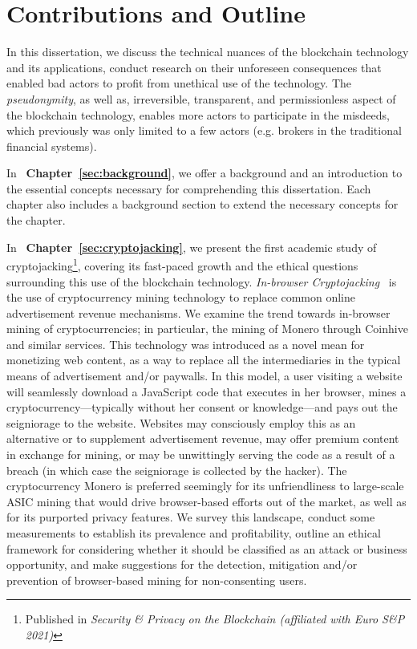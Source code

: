 \section{Contributions and Outline} 

In this dissertation, we discuss the technical nuances of the blockchain technology and its applications, conduct research on their unforeseen consequences that enabled bad actors to profit from unethical use of the technology. The \textit{pseudonymity}, as well as, irreversible, transparent, and permissionless aspect of the blockchain technology, enables more actors to participate in the misdeeds, which previously was only limited to a few actors (e.g. brokers in the traditional financial systems).

In ~\textbf{Chapter~\ref{sec:background}}, we offer a background and an introduction to the essential concepts necessary for comprehending this dissertation. Each chapter also includes a background section to extend the necessary concepts for the chapter.

In ~\textbf{Chapter~\ref{sec:cryptojacking}}, we present the first academic study of cryptojacking\footnote{Published in \textit{Security {\&} Privacy on the Blockchain (affiliated with Euro S{\&}P 2021)}}, covering its fast-paced growth and the ethical questions surrounding this use of the blockchain technology. \textit{In-browser Cryptojacking}~\cite{eskandari2018first} is the use of cryptocurrency mining technology to replace common online advertisement revenue mechanisms. We examine the trend towards in-browser mining of cryptocurrencies; in particular, the mining of Monero through Coinhive and similar services. This technology was introduced as a novel mean for monetizing web content, as a way to replace all the intermediaries in the typical means of advertisement and/or paywalls. In this model, a user visiting a website will seamlessly download a JavaScript code that executes in her browser, mines a cryptocurrency---typically without her consent or knowledge---and pays out the seigniorage to the website. Websites may consciously employ this as an alternative or to supplement advertisement revenue, may offer premium content in exchange for mining, or may be unwittingly serving the code as a result of a breach (in which case the seigniorage is collected by the hacker). The cryptocurrency Monero is preferred seemingly for its unfriendliness to large-scale ASIC mining that would drive browser-based efforts out of the market, as well as for its purported privacy features. We survey this landscape, conduct some measurements to establish its prevalence and profitability, outline an ethical framework for considering whether it should be classified as an attack or business opportunity, and make suggestions for the detection, mitigation and/or prevention of browser-based mining for non-consenting users.



